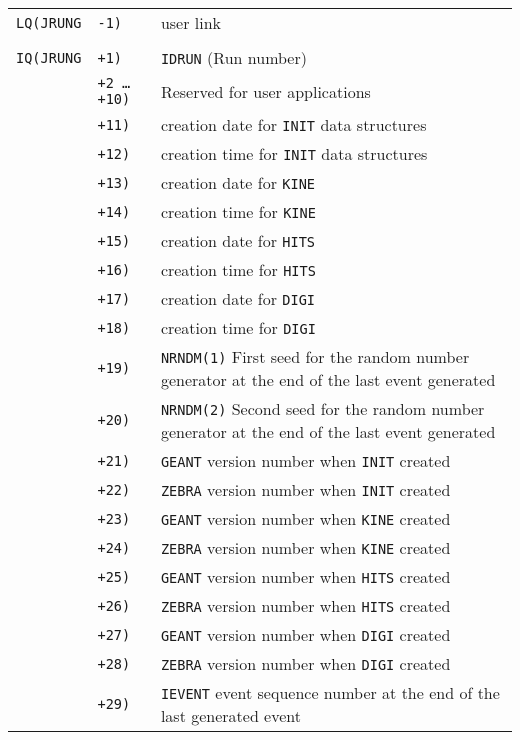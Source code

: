 \begin{tabular}{r@{}ll}
\hspace{2cm} {\tt LQ(JRUNG} &{\tt-1)} &user link      \\
                                                      \\
{\tt IQ(JRUNG}&{\tt+1)} &{\tt IDRUN} (Run number)           \\
&{\tt+2 \dots +10)} &Reserved for user applications    \\
&{\tt+11)} &creation date for {\tt INIT} data structures \\
&{\tt+12)} &creation time for {\tt INIT} data structures \\
&{\tt+13)} &creation date for {\tt KINE}                 \\
&{\tt+14)} &creation time for {\tt KINE}                 \\
&{\tt+15)} &creation date for {\tt HITS}                 \\
&{\tt+16)} &creation time for {\tt HITS}                 \\
&{\tt+17)} &creation date for {\tt DIGI}                 \\
&{\tt+18)} &creation time for {\tt DIGI}                 \\
&{\tt+19)} &\parbox[t]{10cm}{{\tt NRNDM(1)}
First seed for the random number generator 
at the end of the last event generated}\\
&{\tt+20)} &\parbox[t]{10cm}{{\tt NRNDM(2)}
Second seed for the random number generator 
at the end of the last event generated}\\
&{\tt+21)} &{\tt GEANT} version number when {\tt INIT} created  \\
&{\tt+22)} &{\tt ZEBRA} version number when {\tt INIT} created  \\
&{\tt+23)} &{\tt GEANT} version number when {\tt KINE} created  \\
&{\tt+24)} &{\tt ZEBRA} version number when {\tt KINE} created  \\
&{\tt+25)} &{\tt GEANT} version number when {\tt HITS} created  \\
&{\tt+26)} &{\tt ZEBRA} version number when {\tt HITS} created  \\
&{\tt+27)} &{\tt GEANT} version number when {\tt DIGI} created  \\
&{\tt+28)} &{\tt ZEBRA} version number when {\tt DIGI} created  \\
&{\tt+29)} &\parbox[t]{10cm}{{\tt IEVENT} event sequence number 
at the end of the last generated event} \\
\end{tabular}
\vspace{0.7cm}
 

